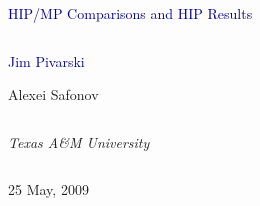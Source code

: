 \documentclass[compress]{beamer}
\begin{document}
\begin{frame}
\vfill
\begin{center}
\textcolor{darkblue}{\Large HIP/MP Comparisons and HIP Results}

\vfill
\begin{columns}
\begin{center}
\large
\textcolor{darkblue}{Jim Pivarski}

\vspace{0.2 cm}
Alexei Safonov
\end{center}
\end{columns}

\begin{columns}
\begin{center}
\scriptsize
{\it Texas A\&M University}
\end{center}
\end{columns}

\vfill
25 May, 2009

\end{center}
\end{frame}


\small
\end{document}

